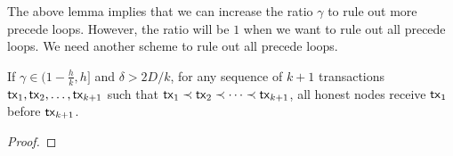 \documentclass[runningheads]{llncs}
\begin{document}
The above lemma implies that we can increase the ratio $\gamma$ to rule out more precede loops. However, the ratio will be $1$ when we want to rule out all precede loops. We need another scheme to rule out all precede loops. 

\begin{lemma}
    If $\gamma \in (1-\frac{h}{k}, h]$ and $\delta > 2D/k$, for any sequence of $k+1$ transactions $\mathsf{tx}_1, \mathsf{tx}_2, \dots, \mathsf{tx}_{k+1}$ such that $\mathsf{tx}_1\prec \mathsf{tx}_2\prec \cdots \prec \mathsf{tx}_{k+1}$, all honest nodes receive $\mathsf{tx}_1$ before $\mathsf{tx}_{k+1}$.
\end{lemma}
\begin{proof}
    
\end{proof}

\begin{credits}
\subsubsection{\ackname} 
\subsubsection{\discintname}

\end{credits}
%
%
%


%
\end{document}
